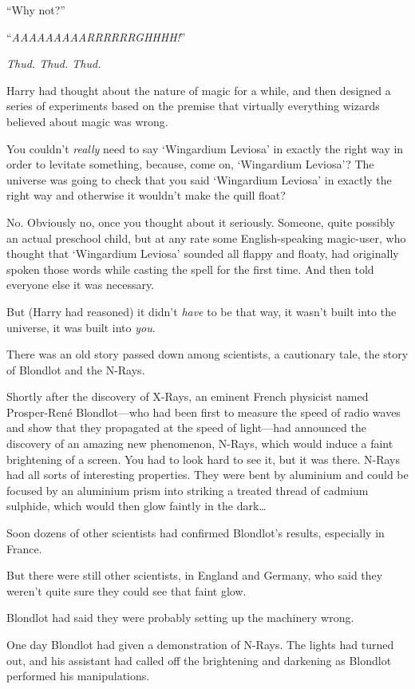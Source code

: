 “Why not?”

“\emph{AAAAAAAAARRRRRRGHHHH!}”

\emph{Thud. Thud. Thud.}

Harry had thought about the nature of magic for a while, and then designed a series of experiments based on the premise that virtually everything wizards believed about magic was wrong.

You couldn’t \emph{really} need to say ‘Wingardium Leviosa’ in exactly the right way in order to levitate something, because, come on, ‘Wingardium Leviosa’? The universe was going to check that you said ‘Wingardium Leviosa’ in exactly the right way and otherwise it wouldn’t make the quill float?

No. Obviously no, once you thought about it seriously. Someone, quite possibly an actual preschool child, but at any rate some English-speaking magic-user, who thought that ‘Wingardium Leviosa’ sounded all flappy and floaty, had originally spoken those words while casting the spell for the first time. And then told everyone else it was necessary.

But (Harry had reasoned) it didn’t \emph{have} to be that way, it wasn’t built into the universe, it was built into \emph{you}.

There was an old story passed down among scientists, a cautionary tale, the story of Blondlot and the N-Rays.

Shortly after the discovery of X-Rays, an eminent French physicist named Prosper-René Blondlot—who had been first to measure the speed of radio waves and show that they propagated at the speed of light—had announced the discovery of an amazing new phenomenon, N-Rays, which would induce a faint brightening of a screen. You had to look hard to see it, but it was there. N-Rays had all sorts of interesting properties. They were bent by aluminium and could be focused by an aluminium prism into striking a treated thread of cadmium sulphide, which would then glow faintly in the dark…

Soon dozens of other scientists had confirmed Blondlot’s results, especially in France.

But there were still other scientists, in England and Germany, who said they weren’t quite sure they could see that faint glow.

Blondlot had said they were probably setting up the machinery wrong.

One day Blondlot had given a demonstration of N-Rays. The lights had turned out, and his assistant had called off the brightening and darkening as Blondlot performed his manipulations.


